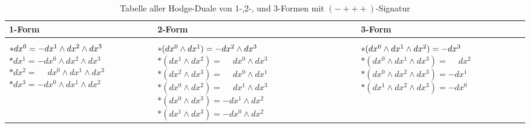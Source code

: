 \begin{table}
	\centering
	\begin{tabularx}{\textwidth}{ 
			| >{\centering\arraybackslash}X 
			| >{\centering\arraybackslash}X 
			| >{\centering\arraybackslash}X | }
		\hline
		\textbf{1-Form} & \textbf{2-Form} & \textbf{3-Form} \\
		\hline
		\( \rule{0pt}{1.5em} {\ast} dx^0 = -dx^1 \wedge dx^2 \wedge dx^3 \) \newline
	\( {\ast} dx^1 = -dx^0 \wedge dx^2 \wedge dx^3 \) \newline
	\( {\ast} dx^2 = \phantom{-} dx^0 \wedge dx^1 \wedge dx^3 \) \newline
	\( {\ast} dx^3 = -dx^0 \wedge dx^1 \wedge dx^2 \, \) 
	&
	\( \rule{0pt}{1.5em} {\ast} (dx^0 \wedge dx^1) = -dx^2 \wedge dx^3 \) \newline
	\( {\ast} (dx^1 \wedge dx^2) = \phantom{-} dx^0 \wedge dx^3 \) \newline
	\( {\ast} (dx^2 \wedge dx^3) = \phantom{-} dx^0 \wedge dx^1 \) \newline
	\( {\ast} (dx^0 \wedge dx^2) = \phantom{-} dx^1 \wedge dx^3 \) \newline
	\( {\ast} (dx^0 \wedge dx^3) = -dx^1 \wedge dx^2 \) \newline
	\( {\ast} (dx^1 \wedge dx^3) = -dx^0 \wedge dx^2 \)
	&
	\( \rule{0pt}{1.5em} {\ast} (dx^0 \wedge dx^1 \wedge dx^2) = -dx^3 \) \newline
	\( {\ast} (dx^0 \wedge dx^1 \wedge dx^3) = \phantom{-} dx^2 \) \newline
	\( {\ast} (dx^0 \wedge dx^2 \wedge dx^3) = -dx^1 \) \newline
	\( {\ast} (dx^1 \wedge dx^2 \wedge dx^3) = -dx^0 \)
		\\
		\hline
	\end{tabularx}
	\caption{Tabelle aller Hodge-Duale von 1-,2-, und 3-Formen mit $({-}{+}{+}{+})$-Signatur}
	\label{maxwell:section:teil1:Hodge-Tabelle}
\end{table}








